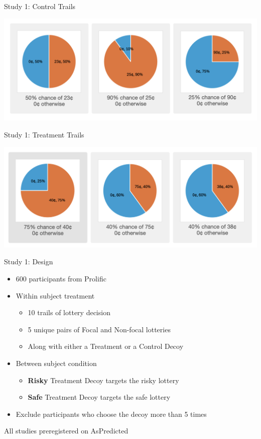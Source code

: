 \documentclass[
  ignorenonframetext,
  aspectratio=169]{beamer}
\begin{document}
\begin{frame}{Study 1: Control Trails}
\label{study-1-control-trails}
\begin{center}
  \includegraphics[width=1\textwidth]{sample_control.png}
\end{center}
\end{frame}

\begin{frame}{Study 1: Treatment Trails}
\label{study-1-treatment-trails}
\begin{center}
  \includegraphics[width=1\textwidth]{sample_treatment.png}
\end{center}
\end{frame}

\begin{frame}{Study 1: Design}
\label{study-1-design}
\begin{itemize}
  \item 600 participants from Prolific
  \pause
  \item Within subject treatment
  \begin{itemize}
    \pause
    \item 10 trails of lottery decision
    \item 5 unique pairs of Focal and Non-focal lotteries
    \item Along with either a Treatment or a Control Decoy
  \end{itemize}
  \pause
  \item Between subject condition
  \begin{itemize}
    \pause
    \item \textbf{Risky} Treatment Decoy targets the risky lottery
    \item \textbf{Safe} Treatment Decoy targets the safe lottery
  \end{itemize}
  \pause
  \item Exclude participants who choose the decoy more than 5 times
\end{itemize}

\vfill

\hfill \tiny *All studies preregistered on AsPredicted
\end{frame}
\end{document}
